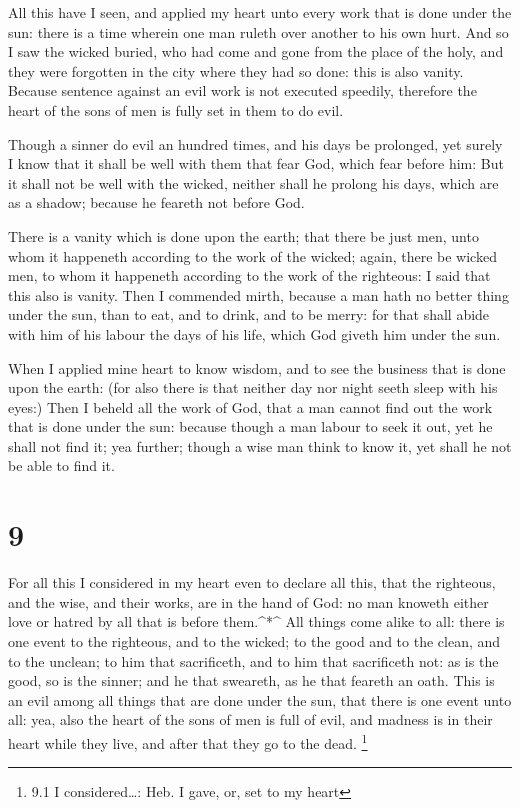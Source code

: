  All this have I seen, and applied my heart unto every work
that is done under the sun: there is a time wherein one man ruleth over
another to his own hurt.  And so I saw the wicked buried,
who had come and gone from the place of the holy, and they were
forgotten in the city where they had so done: this is also vanity.
 Because sentence against an evil work is not executed
speedily, therefore the heart of the sons of men is fully set in them to
do evil.

 Though a sinner do evil an hundred times, and his days be
prolonged, yet surely I know that it shall be well with them that fear
God, which fear before him:  But it shall not be well with
the wicked, neither shall he prolong his days, which are as a shadow;
because he feareth not before God.

 There is a vanity which is done upon the earth; that there
be just men, unto whom it happeneth according to the work of the wicked;
again, there be wicked men, to whom it happeneth according to the work
of the righteous: I said that this also is vanity.  Then I
commended mirth, because a man hath no better thing under the sun, than
to eat, and to drink, and to be merry: for that shall abide with him of
his labour the days of his life, which God giveth him under the sun.

 When I applied mine heart to know wisdom, and to see the
business that is done upon the earth: (for also there is that neither
day nor night seeth sleep with his eyes:)  Then I beheld
all the work of God, that a man cannot find out the work that is done
under the sun: because though a man labour to seek it out, yet he shall
not find it; yea further; though a wise man think to know it, yet shall
he not be able to find it.

\hypertarget{section-8}{%
\section{9}\label{section-8}}

 For all this I considered in my heart even to declare all
this, that the righteous, and the wise, and their works, are in the hand
of God: no man knoweth either love or hatred by all that is before
them.\^{}*\^{}  All things come alike to all: there is one
event to the righteous, and to the wicked; to the good and to the clean,
and to the unclean; to him that sacrificeth, and to him that sacrificeth
not: as is the good, so is the sinner; and he that sweareth, as he that
feareth an oath.  This is an evil among all things that are
done under the sun, that there is one event unto all: yea, also the
heart of the sons of men is full of evil, and madness is in their heart
while they live, and after that they go to the dead. \footnote{9.1 I
  considered\ldots: Heb. I gave, or, set to my heart}

